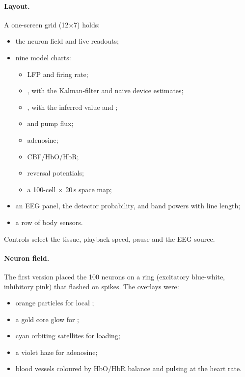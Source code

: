 \paragraph{Layout.} A one-screen grid (12$\times$7) holds:
\begin{itemize}
\item the neuron field and live readouts;
\item nine model charts:
\begin{itemize}
\item LFP and firing rate;
\item \Ko, with the Kalman-filter and naive device estimates;
\item \Cli, with the inferred value and \EGABA;
\item \Nai{} and pump flux;
\item adenosine;
\item CBF/HbO/HbR;
\item reversal potentials;
\item a 100-cell $\times$ 20\,s \Ko{} space map;
\end{itemize}
\item an EEG panel, the detector probability, and band powers with line length;
\item a row of body sensors.
\end{itemize}
Controls select the tissue, playback speed, pause and the EEG source.

\paragraph{Neuron field.} The first version placed the 100 neurons on a ring (excitatory blue-white, inhibitory pink) that flashed on spikes. The overlays were:
\begin{itemize}
\item orange particles for local \Ko;
\item a gold core glow for \Nai;
\item cyan orbiting satellites for \Cli{} loading;
\item a violet haze for adenosine;
\item blood vessels coloured by HbO/HbR balance and pulsing at the heart rate.
\end{itemize}


